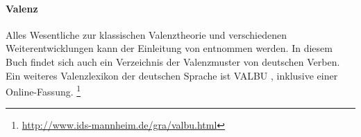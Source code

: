 \begin{sloppypar}
\paragraph*{Valenz}

Alles Wesentliche zur klassischen Valenztheorie und verschiedenen Weiterentwicklungen kann der Einleitung von \citet{HelbigSchenkel1991} entnommen werden.
In diesem Buch findet sich auch ein Verzeichnis der Valenzmuster von deutschen Verben.
Ein weiteres Valenzlexikon der deutschen Sprache ist VALBU \citep{SchumacherEa2004}, inklusive einer Online-Fassung.%
\footnote{\url{http://www.ids-mannheim.de/gra/valbu.html}}

\end{sloppypar}

